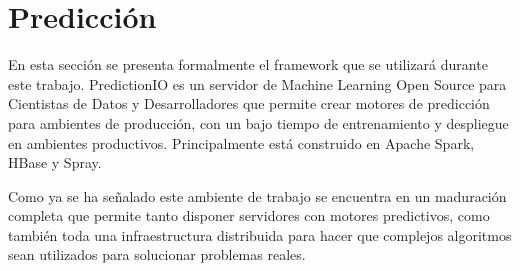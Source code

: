 

\section{Predicción }

  	
En esta sección se presenta formalmente el framework que se utilizará durante este trabajo. PredictionIO es un servidor de Machine Learning Open Source para Cientistas de Datos y Desarrolladores que permite crear motores de predicción para ambientes de producción, con un bajo tiempo de entrenamiento y despliegue en ambientes productivos. Principalmente está construido en Apache Spark, HBase y Spray. 

Como ya se ha señalado este ambiente de trabajo se encuentra en un maduración completa que permite tanto disponer servidores con motores predictivos, como también toda una infraestructura distribuida para hacer que complejos algoritmos sean utilizados para solucionar problemas reales.

















